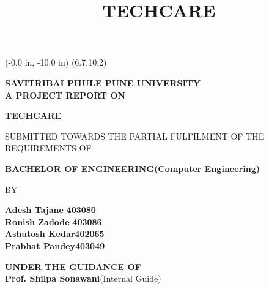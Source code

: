 \documentclass[12pt,a4paper]{report}
\author{}
\title{TECHCARE}
\begin{document}
\pagestyle{empty}
\newpage
\pagestyle{empty}
\thisfancyput(-0.0 in, -10.0 in) {\setlength{\unitlength}{1 in}\framebox(6.7,10.2)}

\begin{center}
	\vspace*{0.2 in}
	\textbf{\large{SAVITRIBAI PHULE PUNE UNIVERSITY}}\\
  \vspace*{0.25 in}
\textbf{A PROJECT REPORT ON}
\vspace{0.05 in}
  \end{center}
\vspace{0.05 in}
	\begin{center}
		\textbf{\large{TECHCARE}} \\
	\end{center}
	
	\vspace{0.1 in}
	\begin{center}
	SUBMITTED TOWARDS THE PARTIAL FULFILMENT OF THE REQUIREMENTS OF
\end{center}
	\vspace{0.1 in}
	\begin{center}
			\textbf{BACHELOR OF ENGINEERING(Computer Engineering)}
     	\end{center}
     \vspace{0.3 in}
		\begin{center}
	    BY
	\end{center}
	
	
	\begin{flushleft}
		\begin{flushleft}
\hspace{1.7in}\textbf{Adesh Tajane}
\hspace{0.38in}\textbf{  403080}\\
\hspace{1.7in}\textbf{Ronish Zadode}    
 \hspace{0.3in}\textbf{  403086}\\
\hspace{1.7in}\textbf{Ashutosh Kedar}\hspace{0.3in}\textbf{402065}\\
\hspace{1.7in}\textbf{Prabhat Pandey}\hspace{0.3in}\textbf{403049}\\
\end{flushleft}
	\end{flushleft}
\vspace{0.05 in}		
	\begin{center}
	  \textbf{UNDER THE GUIDANCE OF}\\
	  \vspace{0.075 in}
	 \textbf{ Prof. Shilpa Sonawani}(Internal Guide)\\
	  
	\end{center}
		
\end{document}
